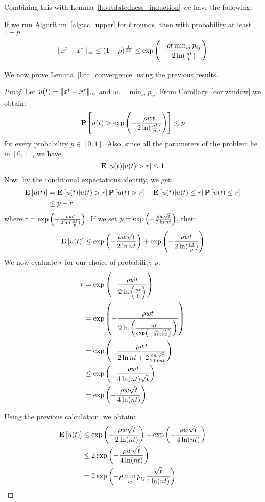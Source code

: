 Combining this with Lemma~\ref{l:outdatedness_induction} we have
the following.
\begin{corollary}\label{cor:window}
If we run Algorithm~\ref{alg:cc_upper} for $t$ rounds, then with probability at least
$1-p$
$$ \| x^{t}-x^* \|_{\infty} \leq (1-\rho)^{\frac{t}{2B}}
\leq \exp \left(-\frac{\rho t\min_{ij}p_{ij}}{2\ln( \frac{nt}{p})} \right)$$
\end{corollary}
We now prove Lemma~\ref{l:cc_convergence} using the previous results.
\begin{proof}
Let $u(t) = \| x^t-x^* \|_{\infty}$ and $w = \min_{ij}p_{ij}$.
From Corollary~\ref{cor:window} we obtain:
$$ \bm{\mathrm{P}}\left[u(t) >\exp\left(-\frac{\rho wt}{2\ln( \frac{nt}{p})} \right)\right] \leq p $$
for every probability $p \in [0,1]$. Also, since all the
parameters of the problem lie in $[0,1]$, we have
$$\Exp{u(t)|u(t) > r} \leq 1$$
Now, by the conditional expectations identity, we get:
\begin{align*}
\Exp{u(t)} &= \Exp{u(t)|u(t) > r}\Prob{u(t) > r} +\Exp{u(t)|u(t) \leq r}\Prob{u(t) \leq r}\\
&\leq p + r
\end{align*}
where $r = \exp \left(-\frac{\rho wt}{2\ln( \frac{nt}{p})}\right)$.
If we set $p = \exp \left(-\frac{\rho w\sqrt{t}}{2\ln nt}\right)$, then:
$$
\Exp{u(t)} \leq \exp \lp(-\frac{\rho w\sqrt{t}}{2\ln nt}\rp)
+ \exp \lp(-\frac{\rho wt}{2\ln( \frac{nt}{p})}\rp)
$$
We now evaluate $r$ for our choice of probability $p$:
\begin{align*}
r
&= \exp \left(-\frac{\rho wt}{2\ln\left( \frac{nt}{p}\right)} \right)\\
&= \exp \left(-\frac{\rho wt}{2\ln\left( \frac{nt}{\exp \left(-\frac{\rho w\sqrt{t}}{2\ln nt}\right) }\right) } \right) \\
&= \exp \left(-\frac{\rho wt}{2\ln nt + 2\frac{\rho w\sqrt{t}}{2\ln nt} }\right)\\
&\leq \exp \left(-\frac{\rho w t}{4\ln(nt) \sqrt{t}}\right)\\
&= \exp \left(-\frac{\rho w\sqrt{t}}{4\ln(nt)}\right)
\end{align*}

Using the previous calculation, we obtain:
\begin{align*}
\Exp{u(t)} &\leq \exp \lp(-\frac{\rho w\sqrt{t}}{2\ln (nt)}\rp) +
\exp \lp(-\frac{\rho w\sqrt{t}}{4\ln(nt)}\rp) \\
&\leq 2\exp \lp(-\frac{\rho w\sqrt{t}}{4\ln(nt)}\rp)\\
&=
    2\exp \lp(- \rho  \min_{ij} p_{ij} \frac{\sqrt{t}}{4\ln(nt)} \rp)
\end{align*}
\end{proof}
